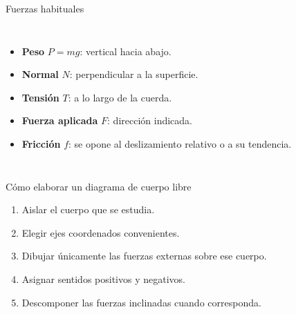 \documentclass[aspectratio=169,11pt]{beamer}
\begin{document}
\begin{frame}{Fuerzas habituales}
\begin{columns}[T]
\begin{itemize}
\item \textbf{Peso} \(P=mg\): vertical hacia abajo.
\item \textbf{Normal} \(N\): perpendicular a la superficie.
\item \textbf{Tensión} \(T\): a lo largo de la cuerda.
\item \textbf{Fuerza aplicada} \(F\): dirección indicada.
\item \textbf{Fricción} \(f\): se opone al deslizamiento relativo o a su tendencia.
\end{itemize}
\centering
{}
\end{columns}
\end{frame}
\begin{frame}{Cómo elaborar un diagrama de cuerpo libre}
\begin{enumerate}
\item Aislar el cuerpo que se estudia.
\item Elegir ejes coordenados convenientes.
\item Dibujar únicamente las fuerzas externas sobre ese cuerpo.
\item Asignar sentidos positivos y negativos.
\item Descomponer las fuerzas inclinadas cuando corresponda.
\end{enumerate}
\begin{center}
\end{center}
\end{frame}
\end{document}
